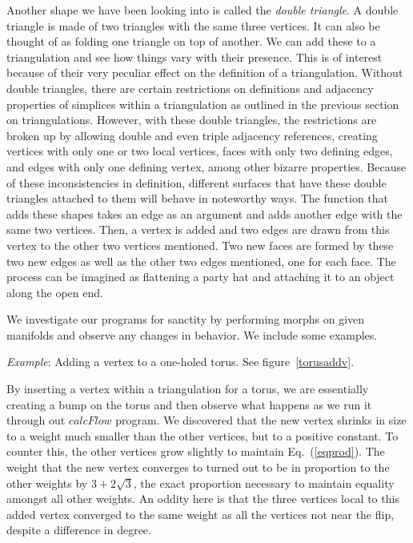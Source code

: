 \documentclass[12pt]{article}
\begin{document}
\noindent Another shape we have been looking into is called the \textit{double triangle}. A double triangle is made of two triangles with the same three vertices. It can also be thought of as folding one triangle on top of another. We can add these to a triangulation and see how things vary with their presence. This is of interest because of their very peculiar effect on the definition of a triangulation. Without double triangles, there are certain restrictions on definitions and adjacency properties of simplices within a triangulation as outlined in the previous section on triangulations. However, with these double triangles, the restrictions are broken up by allowing double and even triple adjacency references, creating vertices with only one or two local vertices, faces with only two defining edges, and edges with only one defining vertex, among other bizarre properties. Because of these inconsistencies in definition, different surfaces that have these double triangles attached to them will behave in noteworthy ways. The function that adds these shapes takes an edge as an argument and adds another edge with the same two vertices. Then, a vertex is added and two edges are drawn from this vertex to the other two vertices mentioned. Two new faces are formed by these two new edges as well as the other two edges mentioned, one for each face. The process can be imagined as flattening a party hat and attaching it to an object along the open end.\newline

\noindent We investigate our programs for sanctity by performing morphs on given manifolds and observe any changes in behavior. We include some examples. \newline

\noindent \textit{Example}: Adding a vertex to a one-holed torus. See figure~\ref{torusaddv}. \newline

\noindent By inserting a vertex within a triangulation for a torus, we are essentially creating a bump on the torus and then observe what happens as we run it through out $calcFlow$ program. We discovered that the new vertex shrinks in size to a weight much smaller than the other vertices, but to a positive constant. To counter this, the other vertices grow slightly to maintain Eq.~(\ref{eqprod}). The weight that the new vertex converges to turned out to be in proportion to the other weights by $3+2\sqrt{3}$, the exact proportion necessary to maintain equality amongst all other weights. An oddity here is that the three vertices local to this added vertex converged to the same weight as all the vertices not near the flip, despite a difference in degree.\newline
\end{document}
